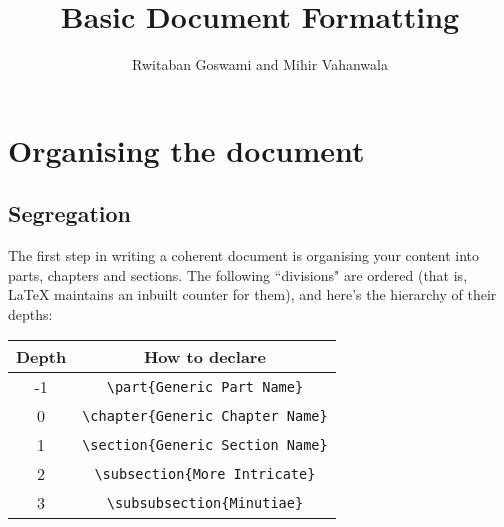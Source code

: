 \documentclass{article}
\begin{document}
\title{Basic Document Formatting}
\author{Rwitaban Goswami and Mihir Vahanwala}

\maketitle

\tableofcontents
\thispagestyle{empty}

\clearpage
{} 


\section{Organising the document}
\subsection{Segregation}
The first step in writing a coherent document is organising your content into parts, chapters and sections. The following ``divisions" are ordered (that is, \LaTeX{} maintains an inbuilt counter for them), and here's the hierarchy of their depths:

\begin{table}[H]
\centering
\begin{tabular}{c|c}
\textbf{Depth} & \textbf{How to declare} \\
\hline
-1 & \verb!\part{Generic Part Name}! \\
0 & \verb!\chapter{Generic Chapter Name}! \\
1 & \verb!\section{Generic Section Name}! \\
2 & \verb!\subsection{More Intricate}! \\
3 & \verb!\subsubsection{Minutiae}! \\
\end{tabular}
\end{table}
\end{document}
